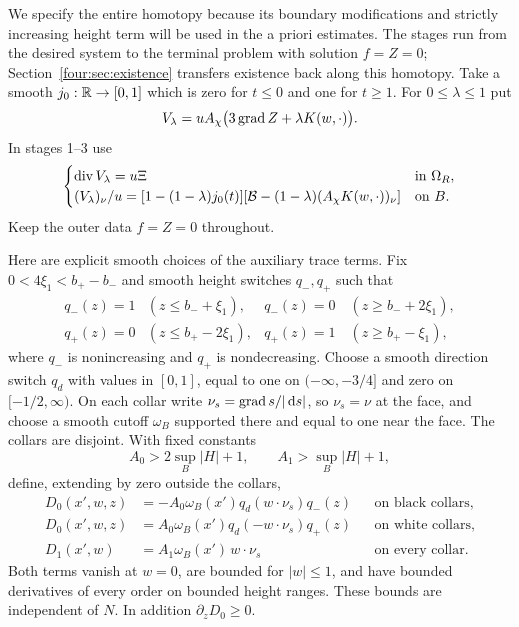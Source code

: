 We specify the entire homotopy because its boundary modifications and
strictly increasing height term will be used in the a priori estimates.
The stages run from the desired system to the terminal problem with
solution $f=Z=0$; Section~\ref{four:sec:existence} transfers existence back
along this homotopy.  Take a smooth
$j_0:\mathbb R\to[0,1]$ which is zero for $t\le0$ and one for $t\ge1$.
For $0\le\lambda\le1$ put
\[
 V_\lambda=uA_\chi\bigl(3\operatorname{grad} Z+\lambda K(w,\cdot)\bigr).
\]
In stages 1--3 use
\begin{equation}\label{four:eq:homotopy-flux}
\begin{cases}
 \operatorname{div} V_\lambda=u\Xi &\text{in }\Omega_R,\\
 (V_\lambda)_\nu/u=
 [1-(1-\lambda)j_0(t)]
 [\mathcal B-(1-\lambda)(A_\chi K(w,\cdot))_\nu]
 &\text{on }B.
\end{cases}
\end{equation}
Keep the outer data $f=Z=0$ throughout.

Here are explicit smooth choices of the auxiliary trace terms.  Fix
$0<4\xi_1<b_+-b_-$ and smooth height switches $q_-,q_+$ such that
\[
\begin{array}{lll}
 q_-(z)=1 &(z\le b_-+\xi_1),&q_-(z)=0\quad(z\ge b_-+2\xi_1),\\
 q_+(z)=0 &(z\le b_+-2\xi_1),&q_+(z)=1\quad(z\ge b_+-\xi_1),
\end{array}
\]
where $q_-$ is nonincreasing and $q_+$ is nondecreasing.  Choose a smooth
direction switch $q_d$ with values in $[0,1]$, equal to one on
$(-\infty,-3/4]$ and zero on $[-1/2,\infty)$.  On each collar write
$\nu_s=\operatorname{grad} s/|\,\mathrm d s|$, so $\nu_s=\nu$ at the face, and choose a smooth cutoff $\omega_B$ supported
there and equal to one near the face.  The collars are disjoint.  With
fixed constants
\[
 A_0>2\sup_B|H|+1,\qquad A_1>\sup_B|H|+1,
\]
define, extending by zero outside the collars,
\begin{equation}\label{four:sys:switches}
\begin{aligned}
 D_0(x',w,z)
  &=-A_0\omega_B(x')q_d(w\cdot\nu_s)q_-(z)
                      &&\text{on black collars},\\
 D_0(x',w,z)
  &= A_0\omega_B(x')q_d(-w\cdot\nu_s)q_+(z)
                      &&\text{on white collars},\\
 D_1(x',w)&=A_1\omega_B(x')\,w\cdot\nu_s
                      &&\text{on every collar}.
\end{aligned}
\end{equation}
Both terms vanish at $w=0$, are bounded for $|w|\le1$, and have bounded
derivatives of every order on bounded height ranges.  These bounds are
independent of $N$.  In addition $\partial_zD_0\ge0$.

